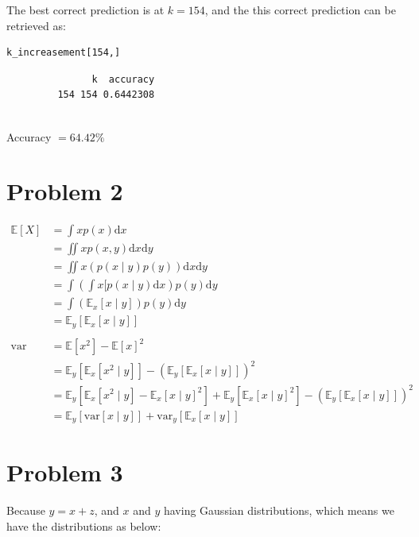 \documentclass[twoside,11pt]{homework}
\begin{document}
\begin{enumerate}
		The best correct prediction is at $k=154$, and the this correct prediction can be retrieved as:
		
		\begin{lstlisting}
k_increasement[154,]
		\end{lstlisting}
		
		\begin{verbatim}
		       k  accuracy
		 154 154 0.6442308
		
		\end{verbatim}
		
		Accuracy $=64.42\%$
		
	\end{enumerate}


\section*{Problem 2}

	\begin{align*}
	\mathbb{E}[X] &= \int x p(x) \mathrm{d}x\\
	&= \iint x p(x,y) \mathrm{d}x \mathrm{d}y\\
	&= \iint x  \left( p(x \mid y) p(y) \right) \mathrm{d}x \mathrm{d}y\\
	&= \int \left( \int x  [ p(x \mid y) \mathrm{d}x \right) p(y) \mathrm{d}y\\
	&= \int \left( \mathbb{E}_x[x \mid y] \right) p(y) \mathrm{d}y\\
	&= \mathbb{E}_y[ \mathbb{E}_x[x \mid y] ]\\
	\\
	\mathrm{var} &= \mathbb{E}[x^2] - \mathbb{E}[x]^2\\
	&= \mathbb{E}_y[ \mathbb{E}_x[x^2 \mid y] ]	- ( \mathbb{E}_y[ \mathbb{E}_x[x \mid y] ] )^2\\
	&= \mathbb{E}_y[ \mathbb{E}_x[x^2 \mid y] - \mathbb{E}_x[x \mid y]^2] + \mathbb{E}_y[\mathbb{E}_x[x \mid y]^2]	- ( \mathbb{E}_y[ \mathbb{E}_x[x \mid y] ] )^2\\
	&= \mathbb{E}_y [\mathrm{var}[x \mid y]] + \mathrm{var}_y[\mathbb{E}_x[x \mid y]]
	\end{align*}
	
	
\section*{Problem 3}

Because $y=x+z$, and $x$ and $y$ having Gaussian distributions, which means we have the distributions as below:
\end{document}
